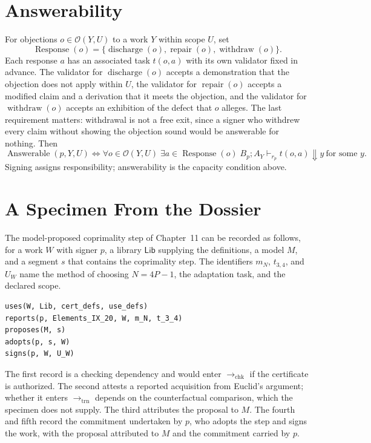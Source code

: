 \documentclass[11pt]{book}
\theoremstyle{definition}
\theoremstyle{remark}
\begin{document}
\section*{Answerability}

For objections $o\in\mathcal O(Y,U)$ to a work $Y$ within scope $U$, set
\[
\operatorname{Response}(o)=\{\operatorname{discharge}(o),\operatorname{repair}(o),\operatorname{withdraw}(o)\}.
\]
Each response $a$ has an associated task $t(o,a)$ with its own validator fixed in advance. The validator for $\operatorname{discharge}(o)$ accepts a demonstration that the objection does not apply within $U$, the validator for $\operatorname{repair}(o)$ accepts a modified claim and a derivation that it meets the objection, and the validator for $\operatorname{withdraw}(o)$ accepts an exhibition of the defect that $o$ alleges. The last requirement matters: withdrawal is not a free exit, since a signer who withdrew every claim without showing the objection sound would be answerable for nothing. Then
\[
\operatorname{Answerable}(p,Y,U)\iff\forall o\in\mathcal O(Y,U)\;\exists a\in\operatorname{Response}(o)\;
B_p;A_Y\vdash_{r_p}t(o,a)\Downarrow y\ \text{for some }y.
\]
Signing assigns responsibility; answerability is the capacity condition above.

\section*{A Specimen From the Dossier}

The model-proposed coprimality step of Chapter~11 can be recorded as follows, for a work $W$ with signer $p$, a library $\mathsf{Lib}$ supplying the definitions, a model $M$, and a segment $s$ that contains the coprimality step. The identifiers $m_N$, $t_{3,4}$, and $U_W$ name the method of choosing $N=4P-1$, the adaptation task, and the declared scope.
\begin{verbatim}
uses(W, Lib, cert_defs, use_defs)
reports(p, Elements_IX_20, W, m_N, t_3_4)
proposes(M, s)
adopts(p, s, W)
signs(p, W, U_W)
\end{verbatim}
The first record is a checking dependency and would enter $\to_{\mathrm{chk}}$ if the certificate is authorized. The second attests a reported acquisition from Euclid's argument; whether it enters $\to_{\mathrm{trn}}$ depends on the counterfactual comparison, which the specimen does not supply. The third attributes the proposal to $M$. The fourth and fifth record the commitment undertaken by $p$, who adopts the step and signs the work, with the proposal attributed to $M$ and the commitment carried by $p$.
\end{document}
